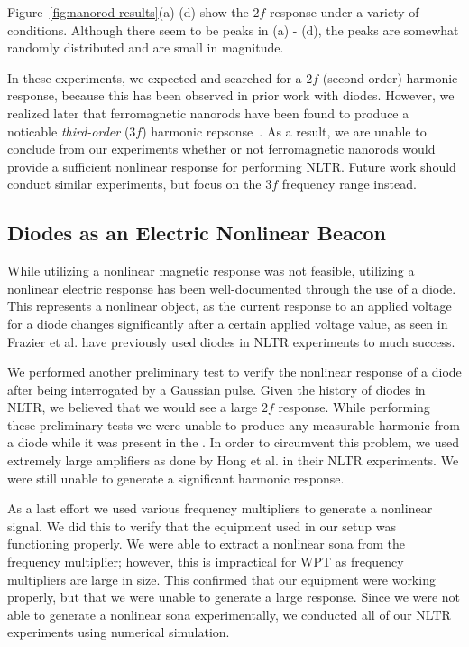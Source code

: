Figure~\ref{fig:nanorod-results}(a)-(d) show the $2f$ response under a variety of conditions. Although there seem to be peaks in (a) - (d), the peaks are somewhat randomly distributed and are small in magnitude.

In these experiments, we expected and searched for a $2f$ (second-order) harmonic response, because this has been observed in prior work with diodes. However, we realized later that ferromagnetic nanorods have been found to produce a noticable \textit{third-order} ($3f$) harmonic repsonse~\cite{nanorod-third-order}. As a result, we are unable to conclude from our experiments whether or not ferromagnetic nanorods would provide a sufficient nonlinear response for performing NLTR. Future work should conduct similar experiments, but focus on the $3f$ frequency range instead.

\subsection{Diodes as an Electric Nonlinear Beacon}

While utilizing a nonlinear magnetic response was not feasible, utilizing a nonlinear electric response has been well-documented through the use of a diode. This represents a nonlinear object, as the current response to an applied voltage for a diode changes significantly after a certain applied voltage value, as seen in Frazier et al. have previously used diodes in NLTR experiments to much success.

We performed another preliminary test to verify the nonlinear response of a diode after being interrogated by a Gaussian pulse. Given the history of diodes in NLTR, we believed that we would see a large $2f$ response. While performing these preliminary tests we were unable to produce any measurable harmonic from a diode while it was present in the \giga{}. In order to circumvent this problem, we used extremely large amplifiers as done by Hong et al. in their NLTR experiments. We were still unable to generate a significant harmonic response.

As a last effort we used various frequency multipliers to generate a nonlinear signal. We did this to verify that the equipment used in our setup was functioning properly. We were able to extract a nonlinear sona from the frequency multiplier; however, this is impractical for WPT as frequency multipliers are large in size. This confirmed that our equipment were working properly, but that we were unable to generate a large response. Since we were not able to generate a nonlinear sona experimentally, we conducted all of our NLTR experiments using numerical simulation.
